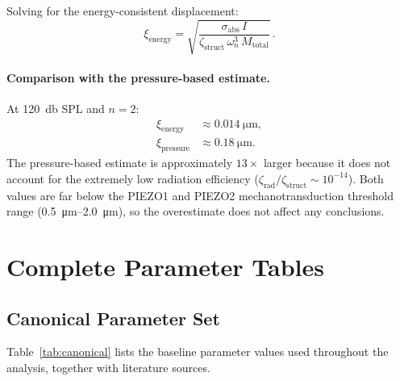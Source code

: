 \documentclass[12pt]{article}
\begin{document}
Solving for the energy-consistent displacement:
\begin{equation}
  \boxed{
    \xi_{\mathrm{energy}} = \sqrt{\frac{\sigma_{\mathrm{abs}}\,I}
      {\zeta_{\mathrm{struct}}\,\omega_{n}^{3}\,M_{\mathrm{total}}}}
  } \,.
  \tag{S17}
  \label{eq:xi_energy}
\end{equation}

\paragraph{Comparison with the pressure-based estimate.}
At \SI{120}{\decibel} SPL and $n=2$:
\begin{align*}
  \xi_{\mathrm{energy}} &\approx \SI{0.014}{\micro\metre}, \\
  \xi_{\mathrm{pressure}} &\approx \SI{0.18}{\micro\metre}.
\end{align*}
The pressure-based estimate is approximately $13\times$ larger because it
does not account for the extremely low radiation efficiency
($\zeta_{\mathrm{rad}}/\zeta_{\mathrm{struct}} \sim 10^{-14}$).  Both values
are far below the PIEZO1 and PIEZO2 mechanotransduction threshold range
(\SIrange{0.5}{2.0}{\micro\metre}), so the overestimate does not affect any
conclusions.


\section{Complete Parameter Tables}
\label{sec:tables}

\subsection{Canonical Parameter Set}
\label{sec:canonical_params}

Table~\ref{tab:canonical} lists the baseline parameter values used throughout
the analysis, together with literature sources.
\end{document}
